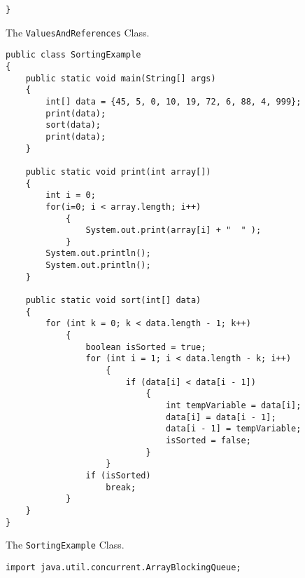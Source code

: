 \documentclass[12pt]{article}
\begin{document}
\begin{enumerate}
\begin{figure}[t]
{\begin{verbatim}
}
\end{verbatim}
}

\caption{The {\tt ValuesAndReferences} Class.}
\label{ValuesAndReferences}
\end{figure}

\begin{figure}[t]

\footnotesize{
\begin{verbatim}
public class SortingExample
{
    public static void main(String[] args)
    {
        int[] data = {45, 5, 0, 10, 19, 72, 6, 88, 4, 999};
        print(data);
        sort(data);
        print(data);
    }

    public static void print(int array[])
    {
        int i = 0;
        for(i=0; i < array.length; i++)
            {
                System.out.print(array[i] + "  " );
            }
        System.out.println();
        System.out.println();
    }

    public static void sort(int[] data)
    {
        for (int k = 0; k < data.length - 1; k++)
            {
                boolean isSorted = true;
                for (int i = 1; i < data.length - k; i++)
                    {
                        if (data[i] < data[i - 1])
                            {
                                int tempVariable = data[i];
                                data[i] = data[i - 1];
                                data[i - 1] = tempVariable;
                                isSorted = false;
                            }
                    }
                if (isSorted)
                    break;
            }
    }
}
\end{verbatim}
}

\caption{The {\tt SortingExample} Class.}
\label{SortingExample}
\end{figure}

%
%
%
%
%

\newpage

\begin{figure}[t]

\footnotesize{
\begin{verbatim}
import java.util.concurrent.ArrayBlockingQueue;


\end{verbatim}}
\end{figure}
\end{enumerate}
\end{document}
